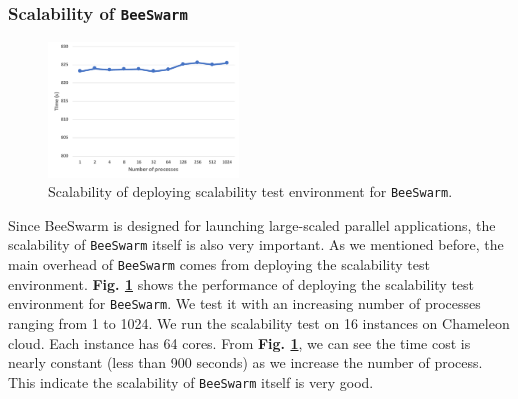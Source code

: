 \subsubsection{Scalability of \texttt{BeeSwarm} } %
\begin{figure}[h]
    \centering
    \includegraphics[width=0.45\textwidth]{figures/scalability.pdf}
    \caption{Scalability of deploying scalability test environment for \texttt{BeeSwarm}.}
    \label{scalability}
\end{figure}

Since BeeSwarm is designed for launching large-scaled parallel applications, the scalability of \texttt{BeeSwarm} itself is also very important. 
As we mentioned before, the main overhead of \texttt{BeeSwarm} comes from deploying the scalability test environment. \textbf{Fig. \ref{scalability}} shows the performance of deploying the scalability test environment for \texttt{BeeSwarm}. We test it with an increasing number of processes ranging from 1 to 1024. 
We run the scalability test on 16 instances on Chameleon cloud. Each instance has 64 cores. From \textbf{Fig. \ref{scalability}}, we can see the time cost is nearly constant (less than 900 seconds) as we increase the number of process. This indicate the scalability of \texttt{BeeSwarm} itself is very good.


